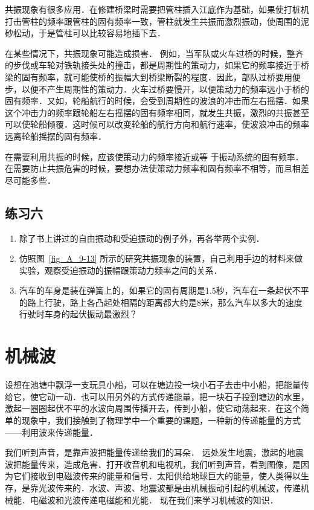 共振现象有很多应用．在修建桥梁时需要把管柱插入江底作为基础，如果使打桩机打击管柱的频率跟管柱的固有频率一致，管柱就发生共振而激烈振动，使周围的泥砂松动，于是管柱可以比较容易地插下去．

在某些情况下，共振现象可能造成损害．
例如，当军队或火车过桥的时候，整齐的步伐或车轮对铁轨接头处的撞击，都是周期性的策动力，如果它的频率接近于桥梁的固有频率，就可能使桥的振幅大到桥梁断裂的程度．因此，部队过桥要用便步，以便不产生周期性的策动力．火车过桥要慢开，以便策动力的频率远小于桥的固有频率．又如，轮船航行的时候，会受到周期性的波浪的冲击而左右摇摆．如果这个冲击力的频率跟轮船左右摇摆的固有频率相同，就发生共振，激烈的共振甚至可以使轮船倾覆．这时候可以改变轮船的航行方向和航行速率，使波浪冲击的频率远离轮船摇摆的固有频率．

在需要利用共振的时候，应该使策动力的频率接近或等
于振动系统的固有频率．
在需要防止共振危害的时候，要想办法使策动力频率和固有频率不相等，而且相差尽可能多些．

\subsection*{练习六}
\begin{enumerate}
    \item 除了书上讲过的自由振动和受迫振动的例子外，再各举两个实例．
    \item 仿照图~\ref{fig_A_9-13} 所示的研究共振现象的装置，自己利用手边的材料来做实验，观察受迫振动的振幅跟策动力频率之间的关系．
    \item 汽车的车身是装在弹簧上的，如果它的固有周期是1.5秒，汽车在一条起伏不平的路上行驶，路上各凸起处相隔的距离都大约是8米，那么汽车以多大的速度行驶时车身的起伏振动最激烈？
\end{enumerate}


\section{机械波}
设想在池塘中飘浮一支玩具小船，可以在塘边投一块小石子去击中小船，把能量传给它，使它动一动．也可以用另外的方式传递能量，把一块石子投到塘边的水里，激起一圈圈起伏不平的水波向周围传播开去，传到小船，使它动荡起来．在这个简单的现象中，我们接触到了物理学中一个重要的课题，一种新的传递能量的方式——利用波来传递能量．

我们听到声音，是靠声波把能量传递给我们的耳朵．
远处发生地震，激起的地震波把能量传来，造成危害．打开收音机和电视机，我们听到声音，看到图像，是因为它们接收到电磁波传来的能量和信号．太阳供给地球巨大的能量，使人类得以生存，是靠光波传来的．水波、声波、地震波都是由机械振动引起的机械波，传递机械能．电磁波和光波传递电磁能和光能．
现在我们来学习机械波的知识．


